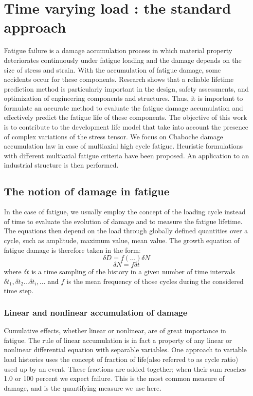 \documentclass[3p,times,procedia,number]{elsarticle}
\begin{document}
\section{Time varying load : the standard approach}
Fatigue failure is a damage accumulation process in which material property deteriorates continuously under
fatigue loading and the damage depends on the size of
stress and strain. With the accumulation of fatigue
damage, some accidents occur for these components. Research shows that a reliable lifetime prediction method is
particularly important in the design, safety assessments,
and optimization of engineering components and structures. Thus, it is important to formulate an accurate method
to evaluate the fatigue damage accumulation and effectively predict the fatigue life of these components.
The objective of this work is to contribute to the development life model that take into account the presence of complex variations of the stress tensor. We focus on Chaboche damage accumulation law in case of multiaxial high cycle fatigue. Heuristic formulations with different multiaxial fatigue criteria have been proposed. An application to an industrial structure is then performed.

\subsection{The notion of damage in fatigue}


In the case of fatigue, we usually employ the concept of the loading cycle instead of time to evaluate the evolution of damage and to measure the fatigue lifetime. The equations then depend on the load through globally defined quantities over a cycle, such as amplitude, maximum value, mean value.
The growth equation of fatigue damage is therefore taken in the form:
$$\delta D=f(...)\delta N$$
$$\delta N=f\delta t$$
where $\delta t$ is a time sampling of the history in a given number of time intervals $\delta t_1,\delta t_2 ... \delta t_i, ...$ and $f$ is the mean frequency of those cycles during the considered time step.

\subsubsection{Linear and nonlinear accumulation of damage}
Cumulative effects, whether linear or nonlinear, are of great importance in fatigue. The rule of linear accumulation is in fact a property of any linear or nonlinear differential equation with separable variables. One approach to variable load histories uses the concept of fraction of life(also referred to as cycle ratio) used up by an event. These fractions are added together; when their sum reaches 1.0 or 100 percent we expect failure. This is the most common measure of damage, and is the quantifying measure we use here. 
\end{document}
